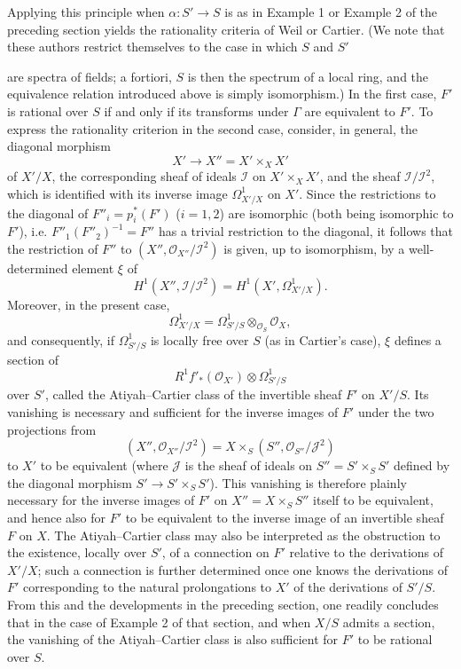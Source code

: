Applying this principle when $\alpha:S'\longrightarrow S$ is as in Example 1
or Example 2 of the preceding section yields the rationality criteria of Weil
or Cartier. (We note that these authors restrict themselves to the case in
which $S$ and $S'$

are spectra of fields; a fortiori, $S$ is then the spectrum of a local ring,
and the equivalence relation introduced above is simply isomorphism.) In the
first case, $F'$ is rational over $S$ if and only if its transforms under
$\Gamma$ are equivalent to $F'$. To express the rationality criterion in the
second case, consider, in general, the diagonal morphism
\[
  X'\longrightarrow X''=X'\times_XX'
\]
of $X'/X$, the corresponding sheaf of ideals $\mathcal I$ on
$X'\times_XX'$, and the sheaf $\mathcal I/\mathcal I^2$, which is identified
with its inverse image $\Omega^1_{X'/X}$ on $X'$. Since the restrictions to the
diagonal of $F''_i=p_i^*(F')$ ($i=1,2$) are isomorphic (both being isomorphic
to $F'$), i.e. $F''_1(F''_2)^{-1}=F''$ has a trivial restriction to the
diagonal, it follows that the restriction of $F''$ to
$(X'',\mathcal O_{X''}/\mathcal I^2)$ is given, up to isomorphism, by a
well-determined element $\xi$ of
\[
  H^1(X'',\mathcal I/\mathcal I^2)
  =H^1(X',\Omega^1_{X'/X}).
\]
Moreover, in the present case,
\[
  \Omega^1_{X'/X}
  =\Omega^1_{S'/S}\otimes_{\mathcal O_S}\mathcal O_X,
\]
and consequently, if $\Omega^1_{S'/S}$ is locally free over $S$ (as in
Cartier's case), $\xi$ defines a section of
\[
  R^1f'_*(\mathcal O_{X'})\otimes\Omega^1_{S'/S}
\]
over $S'$, called the Atiyah--Cartier class of the invertible sheaf $F'$ on
$X'/S$. Its vanishing is necessary and sufficient for the inverse images of
$F'$ under the two projections from
\[
  (X'',\mathcal O_{X''}/\mathcal I^2)
  =X\times_S(S'',\mathcal O_{S''}/\mathcal J^2)
\]
to $X'$ to be equivalent (where $\mathcal J$ is the sheaf of ideals on
$S''=S'\times_SS'$ defined by the diagonal morphism
$S'\longrightarrow S'\times_SS'$). This vanishing is therefore plainly
necessary for the inverse images of $F'$ on $X''=X\times_SS''$ itself to be
equivalent, and hence also for $F'$ to be equivalent to the inverse image of
an invertible sheaf $F$ on $X$. The Atiyah--Cartier class may also be
interpreted as the obstruction to the existence, locally over $S'$, of a
connection on $F'$ relative to the derivations of $X'/X$; such a connection is
further determined once one knows the derivations of $F'$ corresponding to the
natural prolongations to $X'$ of the derivations of $S'/S$. From this and the
developments in the preceding section, one readily concludes that in the case
of Example 2 of that section, and when $X/S$ admits a section, the vanishing of
the Atiyah--Cartier class is also sufficient for $F'$ to be rational over $S$.

